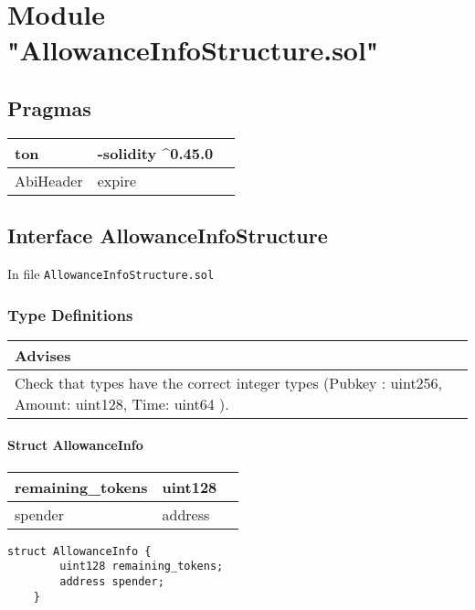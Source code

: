
\section{Module "AllowanceInfoStructure.sol"}


\subsection{Pragmas}


\noindent\begin{tabular}{|l|l|p{5cm}|}\hline
ton & -solidity \^{}0.45.0 &\\\hline
AbiHeader &  expire &\\\hline
\end{tabular}


\subsection{Interface AllowanceInfoStructure}


In file {\tt AllowanceInfoStructure.sol}

\subsubsection{Type Definitions}


\ifsoldraft
\noindent\begin{tabular}{|p{12cm}|}\hline
\rowcolor{green}Advises
\\\hline
Check that types have the correct integer types (Pubkey : uint256, Amount: uint128, Time: uint64 ).
\\\hline\end{tabular}
\fi

\paragraph{Struct AllowanceInfo}


\ifsoltables
\noindent\begin{tabular}{|l|l|p{6cm}|}\hline
remaining\_{}tokens & uint128 & \\\hline
spender & address & \\\hline
\end{tabular}
\fi


\begin{lstlisting}[firstnumber=6]
    struct AllowanceInfo {
        uint128 remaining_tokens;
        address spender;
    }
\end{lstlisting}
